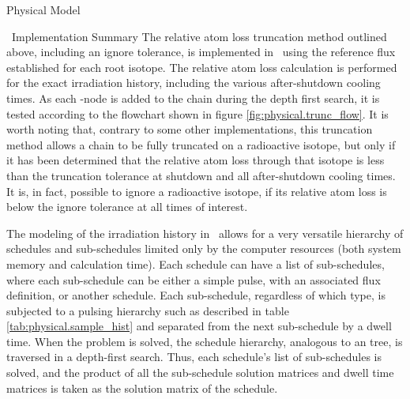 \begin{chapter}{Physical Model\label{chap:physical}}
\begin{section}{\ALARA\ Implementation Summary}
  The relative atom loss truncation method outlined above, including
  an ignore tolerance, is implemented in \ALARA\ using the reference
  flux established for each root isotope.  The relative atom loss
  calculation is performed for the exact irradiation history,
  including the various after-shutdown cooling times.  As each
  \pc-node is added to the chain during the depth first search, it is
  tested according to the flowchart shown in figure
  \ref{fig:physical.trunc_flow}.  It is worth noting that, contrary to
  some other implementations\cite{DKRICF,DKRP}, this truncation method
  allows a chain to be fully truncated on a radioactive isotope, but
  only if it has been determined that the relative atom loss through
  that isotope is less than the truncation tolerance at shutdown and
  all after-shutdown cooling times.  It is, in fact, possible to
  ignore a radioactive isotope, if its relative atom loss is below the
  ignore tolerance at all times of interest.
  
  The modeling of the irradiation history in \ALARA\ allows for a
  very versatile hierarchy of schedules and sub-schedules limited only
  by the computer resources (both system memory and calculation time).
  Each schedule can have a list of sub-schedules, where each
  sub-schedule can be either a simple pulse, with an associated flux
  definition, or another schedule.  Each sub-schedule, regardless of
  which type, is subjected to a pulsing hierarchy such as described in
  table \ref{tab:physical.sample_hist} and separated from the next
  sub-schedule by a dwell time.  When the problem is solved, the
  schedule hierarchy, analogous to an \nary tree, is traversed in a
  depth-first search.  Thus, each schedule's list of sub-schedules is
  solved, and the product of all the sub-schedule solution matrices
  and dwell time matrices is taken as the solution matrix of the
  schedule.
  
\end{section}




\end{chapter}